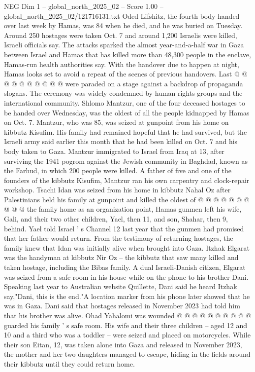 \begin{textsample}{NEG Dim 1 – global\_north\_2025\_02 – Score 1.00 – global\_north\_2025\_02/121716131.txt}
Oded Lifshitz, the fourth body handed over last week by Hamas, was 84 when he died, and he was buried on Tuesday.
Around 250 hostages were taken Oct. 7 and around 1,200 Israelis were killed, Israeli officials say.
The attacks sparked the almost year-and-a-half war in Gaza between Israel and Hamas that has killed more than 48,300 people in the enclave, Hamas-run health authorities say.
With the handover due to happen at night, Hamas looks set to avoid a repeat of the scenes of previous handovers.
Last @ @ @ @ @ @ @ @ @ @ were paraded on a stage against a backdrop of propaganda slogans.
The ceremony was widely condemned by human rights groups and the international community.
Shlomo Mantzur, one of the four deceased hostages to be handed over Wednesday, was the oldest of all the people kidnapped by Hamas on Oct. 7.
Mantzur, who was 85, was seized at gunpoint from his home on kibbutz Kisufim.
His family had remained hopeful that he had survived, but the Israeli army said earlier this month that he had been killed on Oct. 7 and his body taken to Gaza.
Mantzur immigrated to Israel from Iraq at 13, after surviving the 1941 pogrom against the Jewish community in Baghdad, known as the Farhud, in which 200 people were killed.
A father of five and one of the founders of the kibbutz Kisufim, Mantzur ran his own carpentry and clock-repair workshop.
Tsachi Idan was seized from his home in kibbutz Nahal Oz after Palestinians held his family at gunpoint and killed the oldest of @ @ @ @ @ @ @ @ @ @ the family home as an organization point, Hamas gunmen left his wife, Gali, and their two other children, Yael, then 11, and son, Shahar, then 9, behind.
Yael told Israel ' s Channel 12 last year that the gunmen had promised that her father would return.
From the testimony of returning hostages, the family knew that Idan was initially alive when brought into Gaza.
Itzhak Elgarat was the handyman at kibbutz Nir Oz -- the kibbutz that saw many killed and taken hostage, including the Bibas family.
A dual Israeli-Danish citizen, Elgarat was seized from a safe room in his house while on the phone to his brother Dani.
Speaking last year to Australian website Quillette, Dani said he heard Itzhak say,"Dani, this is the end."A location marker from his phone later showed that he was in Gaza.
Dani said that hostages released in November 2023 had told him that his brother was alive.
Ohad Yahalomi was wounded @ @ @ @ @ @ @ @ @ @ guarded his family ' s safe room.
His wife and their three children -- aged 12 and 10 and a third who was a toddler -- were seized and placed on motorcycles.
While their son Eitan, 12, was taken alone into Gaza and released in November 2023, the mother and her two daughters managed to escape, hiding in the fields around their kibbutz until they could return home.

\end{textsample}
